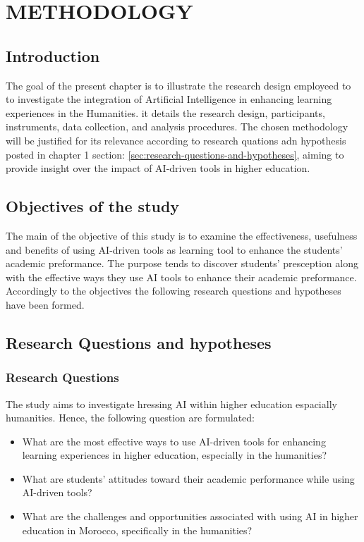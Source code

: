 \chapter{METHODOLOGY}
\section{Introduction}
The goal of the present chapter is to illustrate the research design
employeed to to investigate the integration of Artificial Intelligence
in enhancing learning experiences in the Humanities. it details
the research design, participants, instruments, data collection, and
analysis procedures. The chosen methodology will be justified for its
relevance according to research quations adn hypothesis posted in chapter 1
section: \ref{sec:research-questions-and-hypotheses}, aiming to provide insight
over the impact of AI-driven tools in higher education.
\section{Objectives of the study}
The main of the objective of this study is to examine the effectiveness, usefulness and
benefits of using AI-driven tools as learning tool to enhance the students' academic preformance.
The purpose tends to discover students' presception along with the effective ways they use AI tools
to enhance their academic preformance. Accordingly to the objectives the following research questions
and hypotheses have been formed.
\section{Research Questions and hypotheses}
\subsection{Research Questions}
The study aims to investigate hressing AI within higher education espacially humanities. Hence,
the following question are formulated:
\begin{itemize}
	\item What are the most effective ways to use AI-driven
	      tools for enhancing learning experiences in higher education,
	      especially in the humanities?
	\item What are students’ attitudes toward their academic performance
	      while using AI-driven tools?
	\item What are the challenges and opportunities associated
	      with using AI in higher education in Morocco,
	      specifically in the humanities?
\end{itemize}

